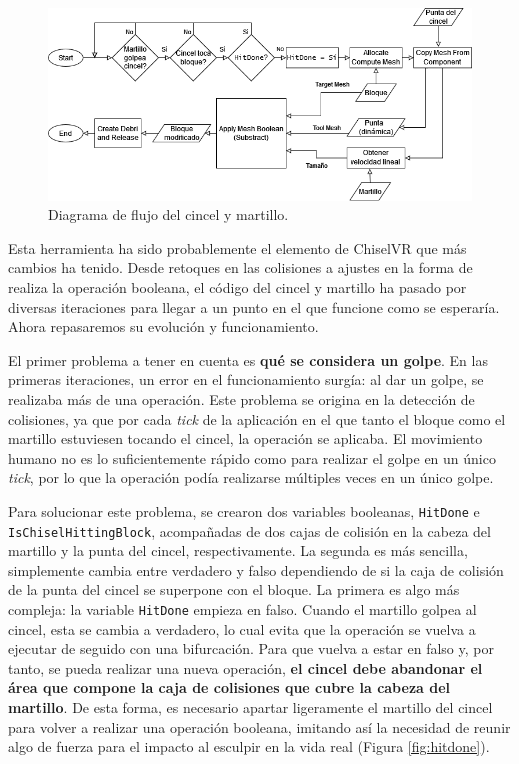 \begin{figure}[H]
	\centering
	\includegraphics[width=12cm]{imagenes/flowchart3}
	\caption{Diagrama de flujo del cincel y martillo.}
	\label{fig:fc3}
\end{figure}

Esta herramienta ha sido probablemente el elemento de ChiselVR que más cambios ha tenido. Desde retoques en las colisiones a ajustes en la forma de realiza la operación booleana, el código del cincel y martillo ha pasado por diversas iteraciones para llegar a un punto en el que funcione como se esperaría. Ahora repasaremos su evolución y funcionamiento.

El primer problema a tener en cuenta es \textbf{qué se considera un golpe}. En las primeras iteraciones, un error en el funcionamiento surgía: al dar un golpe, se realizaba más de una operación. Este problema se origina en la detección de colisiones, ya que por cada \textit{tick} de la aplicación en el que tanto el bloque como el martillo estuviesen tocando el cincel, la operación se aplicaba. El movimiento humano no es lo suficientemente rápido como para realizar el golpe en un único \textit{tick}, por lo que la operación podía realizarse múltiples veces en un único golpe.

Para solucionar este problema, se crearon dos variables booleanas, \texttt{HitDone} e \texttt{IsChiselHittingBlock}, acompañadas de dos cajas de colisión en la cabeza del martillo y la punta del cincel, respectivamente. La segunda es más sencilla, simplemente cambia entre verdadero y falso dependiendo de si la caja de colisión de la punta del cincel se superpone con el bloque. La primera es algo más compleja: la variable \texttt{HitDone} empieza en falso. Cuando el martillo golpea al cincel, esta se cambia a verdadero, lo cual evita que la operación se vuelva a ejecutar de seguido con una bifurcación. Para que vuelva a estar en falso y, por tanto, se pueda realizar una nueva operación, \textbf{el cincel debe abandonar el área que compone la caja de colisiones que cubre la cabeza del martillo}. De esta forma, es necesario apartar ligeramente el martillo del cincel para volver a realizar una operación booleana, imitando así la necesidad de reunir algo de fuerza para el impacto al esculpir en la vida real (Figura \ref{fig:hitdone}).

